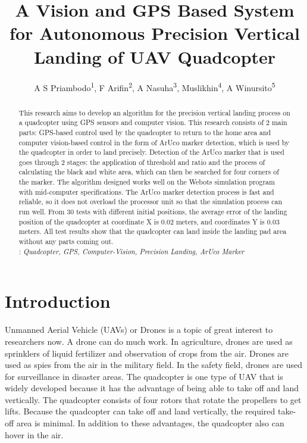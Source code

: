 \documentclass[a4paper]{jpconf}
\begin{document}
\title{A Vision and GPS Based System for Autonomous Precision Vertical Landing of UAV Quadcopter}

\author{A S Priambodo\textsuperscript{1}, F Arifin\textsuperscript{2}, A Nasuha\textsuperscript{3}, Muslikhin\textsuperscript{4}, A Winursito\textsuperscript{5}}

\address{\textsuperscript{1,2,3,4,5}Department of Electronics and Informatics Engineering of Education, Engineering Faculty, Universitas Negeri Yogyakarta, Indonesia}





\begin{abstract}
    This research aims to develop an algorithm for the precision vertical landing process on a quadcopter using GPS sensors and computer vision. This research consists of 2 main parts: GPS-based control used by the quadcopter to return to the home area and computer vision-based control in the form of ArUco marker detection, which is used by the quadcopter in order to land precisely. Detection of the ArUco marker that is used goes through 2 stages: the application of threshold and ratio and the process of calculating the black and white area, which can then be searched for four corners of the marker. The algorithm designed works well on the Webots simulation program with mid-computer specifications. The ArUco marker detection process is fast and reliable, so it does not overload the processor unit so that the simulation process can run well. From 30 tests with different initial positions, the average error of the landing position of the quadcopter at coordinate X is 0.02 meters, and coordinates Y is 0.03 meters. All test results show that the quadcopter can land inside the landing pad area without any parts coming out.\\

    : \it Quadcopter, GPS, Computer-Vision, Precision Landing, ArUco Marker

\end{abstract}

\section{Introduction}
Unmanned Aerial Vehicle (UAVs) or Drones is a topic of great interest to researchers now. A drone can do much work. In agriculture, drones are used as sprinklers of liquid fertilizer and observation of crops from the air\cite{ref1}. Drones are used as spies from the air in the military field\cite{ref2}. In the safety field, drones are used for surveillance in disaster areas\cite{ref3}. The quadcopter is one type of UAV that is widely developed because it has the advantage of being able to take off and land vertically. The quadcopter consists of four rotors that rotate the propellers to get lifts. Because the quadcopter can take off and land vertically, the required take-off area is minimal. In addition to these advantages, the quadcopter also can hover in the air.
\end{document}

